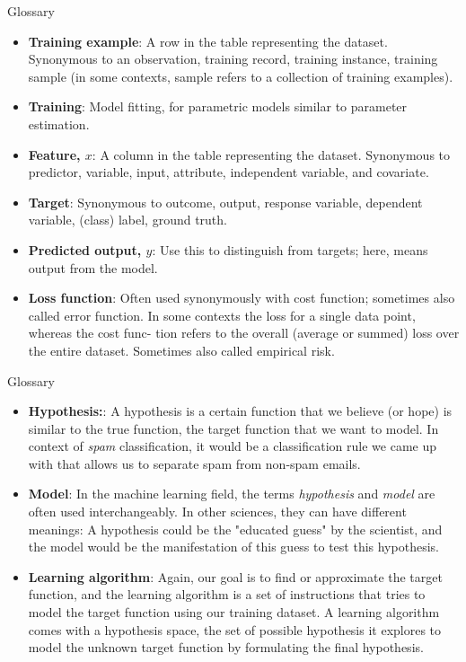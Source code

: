 \documentclass[compress,oilve]{beamer}
\begin{document}
\begin{frame}{Glossary}
\begin{itemize}
\item \textbf{Training example}: A row in the table representing the dataset. Synonymous to an observation, training record, training instance, training sample (in some contexts, sample refers to a collection of training examples).
\item \textbf{Training}: Model fitting, for parametric models similar to parameter estimation.
\item \textbf{Feature, $x$}: A column in the table representing the dataset. Synonymous to predictor, variable, input, attribute, independent variable, and covariate.
\item \textbf{Target}: Synonymous to outcome, output, response variable, dependent variable, (class) label, ground truth.
\item \textbf{Predicted output, $\hat{y}$}: Use this to distinguish from targets; here, means output from the model.
\item \textbf{Loss function}: Often used synonymously with cost function; sometimes also called error function. In some contexts the loss for a single data point, whereas the cost func- tion refers to the overall (average or summed) loss over the entire dataset. Sometimes also called empirical risk.

\end{itemize}
\end{frame}

\begin{frame}{Glossary}
\begin{itemize}
\item \textbf{Hypothesis:}: A hypothesis is a certain function that we believe (or hope) is similar to the true function, the target function that we want to model. In context of \textit{spam} classification, it would be a classification rule we came up with that allows us to separate spam from non-spam emails.

\item \textbf{Model}: In the machine learning field, the terms \textit{hypothesis} and \textit{model} are often used interchangeably. In other sciences, they can have different meanings: A hypothesis could be the "educated guess" by the scientist, and the model would be the manifestation of this guess to test this hypothesis.

\item \textbf{Learning algorithm}: Again, our goal is to find or approximate the target function, and the learning algorithm is a set of instructions that tries to model the target function using our training dataset. A learning algorithm comes with a hypothesis space, the set of possible hypothesis it explores to model the unknown target function by formulating the final hypothesis.

\end{itemize}
\end{frame}
\end{document}
